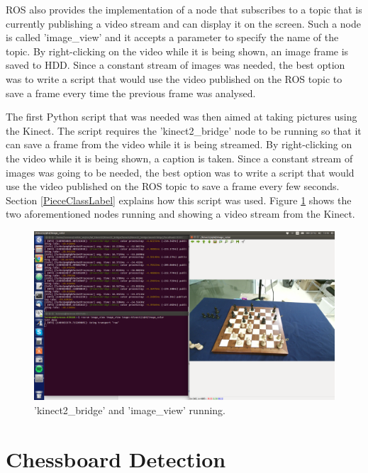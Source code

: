 \documentclass{l4proj}
\begin{document}
ROS also provides the implementation of a node that subscribes to a topic that is currently publishing a video stream and can display it on the screen. Such a node is called 'image\_view' and it accepts a parameter to specify the name of the topic. By right-clicking on the video while it is being shown, an image frame is saved to HDD. Since a constant stream of images was needed, the best option was to write a script that would use the video published on the ROS topic to save a frame every time the previous frame was analysed.

The first Python script that was needed was then aimed at taking pictures using the Kinect. The script requires the 'kinect2\_bridge' node to be running so that it can save a frame from the video while it is being streamed. By right-clicking on the video while it is being shown, a caption is taken. Since a constant stream of images was going to be needed, the best option was to write a script that would use the video published on the ROS topic to save a frame every few seconds. Section \ref{PieceClassLabel} explains how this script was used. Figure \ref{ROSNodesRunning} shows the two aforementioned nodes running and showing a video stream from the Kinect.

\begin{figure}[h!]
\centering
\includegraphics[scale=0.26]{kinect2_bridge_roslaunch.png}
\caption{'kinect2\_bridge' and 'image\_view' running.}
\label{ROSNodesRunning}
\end{figure}

\vspace{10mm}

\section{Chessboard Detection} \label{Chessboard_Detection}
\end{document}
